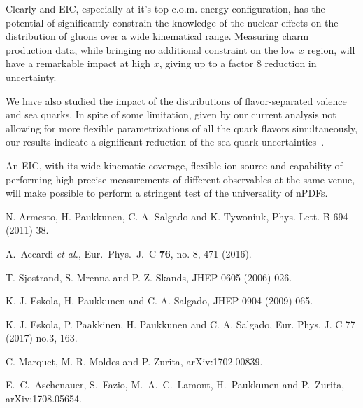 \documentclass{PoS}
\begin{document}
Clearly and EIC, especially at it's top c.o.m. energy configuration, has the potential of significantly constrain the knowledge of the nuclear effects on the distribution of gluons over a wide kinematical range. Measuring charm production data, while bringing no additional constraint on the low $x$ region, will have a remarkable impact at high $x$, giving up to a factor 8 reduction in uncertainty. 

We have also studied the impact of the distributions of flavor-separated valence and sea quarks. In spite of some limitation, given by our current analysis not allowing for more flexible parametrizations of 
all the quark flavors simultaneously, our results indicate a significant reduction of the sea quark uncertainties~\cite{Aschenauer:2017oxs}. 

An EIC, with its wide kinematic coverage, flexible ion source and capability of performing high precise measurements of different observables at the same venue, will make possible to perform a stringent test of the universality of nPDFs. 

\begin{thebibliography}{99}

 N. Armesto, H. Paukkunen, C. A. Salgado and K. Tywoniuk, Phys. Lett. B 694 (2011) 38.

 A.~Accardi {\it et al.}, Eur.\ Phys.\ J.\ C {\bf 76}, no. 8, 471 (2016).

 T. Sjostrand, S. Mrenna and P. Z. Skands, JHEP 0605 (2006) 026.

 K. J. Eskola, H. Paukkunen and C. A. Salgado, JHEP 0904 (2009) 065.

 K. J. Eskola, P. Paakkinen, H. Paukkunen and C. A. Salgado, Eur. Phys. J. C 77 (2017) no.3, 163.

 C. Marquet, M. R. Moldes and P. Zurita, arXiv:1702.00839.
 
 E.~C.~Aschenauer, S.~Fazio, M.~A.~C.~Lamont, H.~Paukkunen and P.~Zurita, arXiv:1708.05654.
 
\end{thebibliography}
\end{document}
